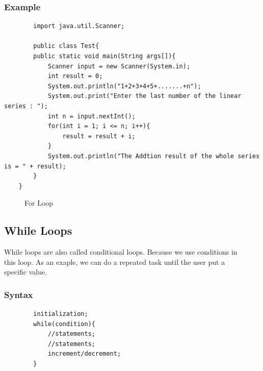 \documentclass[openany]{book}  %
\begin{document}
\subsubsection{Example}
\begin{center}
    \footnotesize
    \begin{verbatim}
        import java.util.Scanner;

        public class Test{
        public static void main(String args[]){
            Scanner input = new Scanner(System.in);
            int result = 0;
            System.out.println("1+2+3+4+5+.......+n");
            System.out.print("Enter the last number of the linear series : ");
            int n = input.nextInt();
            for(int i = 1; i <= n; i++){
                result = result + i;
            }
            System.out.println("The Addtion result of the whole series is = " + result);
        }
    }
    \end{verbatim}
\end{center}
% 
% 
\begin{figure}[htbp]
    \begin{center}
        \caption{For Loop}
    \end{center}
\end{figure}
% 
% 
\subsection{While Loops}
While loops are also called conditional loops. Because we use conditions in \\
this loop. As an exaple, we can do a repeated task until the user put a \\
specific value.
% 
% 
\subsubsection{Syntax}
\begin{center}
    \begin{verbatim}
        initialization;
        while(condition){
            //statements;
            //statements;
            increment/decrement;
        }
    \end{verbatim}
\end{center}
% 
% 
\end{document}
